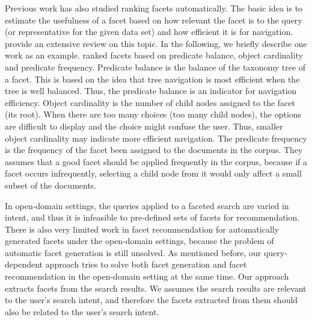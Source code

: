 Previous work has also studied ranking facets automatically. The basic idea is to estimate the usefulness of a facet based on how relevant the facet is to the query (or representative for the given data set) and how efficient it is for navigation. \citet{wei2013survey} provide an extensive review on this topic. In the following, we briefly describe one work as an example. \citet{oren2006extending} ranked facets based on predicate balance, object cardinality and predicate frequency. 
Predicate balance is the balance of the taxonomy tree of a facet. This is based on the idea that tree navigation is most efficient when the tree is well balanced. Thus, the predicate balance is an indicator for navigation efficiency.
Object cardinality is the number of child nodes assigned to the facet (its root).
When there are too many choices (too many child nodes), the options are difficult to display and the choice might confuse the user. Thus, smaller object cardinality may indicate more efficient navigation. The predicate frequency is the frequency of the facet been assigned to the documents in the corpus. They assumes that a good facet should be applied frequently in the corpus, because if a facet occurs infrequently, selecting
a child node from it would only affect a small subset of the documents.

In open-domain settings, the queries applied to a faceted search are varied in intent, and thus it is infeasible to pre-defined sets of facets for recommendation. There is also very limited work in facet recommendation for automatically generated facets under the open-domain settings, because the problem of automatic facet generation is still unsolved. As mentioned before, our query-dependent approach tries to solve both facet generation and facet recommendation in the open-domain setting at the same time. Our approach extracts facets from the search results. We assumes the search results are relevant to the user's search intent, and therefore the facets extracted from them should also be related to the user's search intent.

